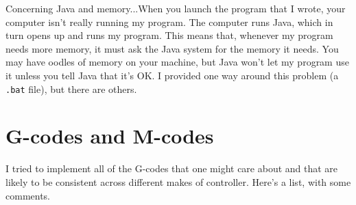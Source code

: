 \documentclass[titlepage,oneside,10pt]{article}
\begin{document}
Concerning Java and memory...When you launch the program that I wrote,
your computer isn't really running my program. The computer runs Java,
which in turn opens up and runs my program. This means that, whenever
my program needs more memory, it must ask the Java system for the
memory it needs. You may have oodles of memory on your machine, but
Java won't let my program use it unless you tell Java that it's OK. I
provided one way around this problem (a {\tt .bat} file), but there
are others.

\section{G-codes and M-codes}

I tried to implement all of the G-codes that one might care about and
that are likely to be consistent across different makes of
controller. Here's a list, with some comments.
\vskip 0.25cm
\end{document}
